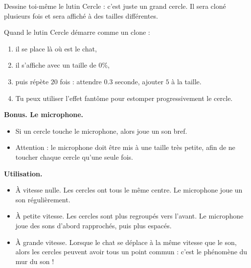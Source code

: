 \documentclass[class=report,crop=false, 12pt]{standalone}
\begin{document}
\begin{activite}
Dessine toi-même le lutin \og Cercle \fg{} : c'est juste un grand cercle. 
Il sera cloné plusieurs fois et sera affiché à des tailles différentes.

Quand le lutin \og{}Cercle\fg{} démarre comme un clone :
\begin{enumerate}
  \item il se place là où est le chat,
  \item il s'affiche avec un taille de $0\%$,
  \item puis répète $20$ fois : attendre $0.3$ seconde, ajouter $5$ à la taille.
  \item Tu peux utiliser l'effet \og fantôme \fg{} pour estomper progressivement le cercle.
\end{enumerate}


\bigskip
\textbf{Bonus. Le microphone.}

\begin{itemize}
  \item Si un cercle touche le microphone, alors joue un son bref.
  \item Attention : le microphone doit être mis à une taille très petite, afin de ne toucher chaque cercle qu'une seule fois.
\end{itemize}




\bigskip
\textbf{Utilisation.}

\begin{itemize}
  \item À vitesse nulle. Les cercles ont tous le même centre. Le microphone joue un son régulièrement.
  
  \item À petite vitesse. Les cercles sont plus regroupés vers l'avant. Le microphone joue des sons d'abord rapprochés, puis plus espacés. 
  
  \item À grande vitesse. Lorsque le chat se déplace à la même vitesse que le son, alors les cercles peuvent avoir tous un point commun : c'est le phénomène du mur du son ! 
\end{itemize}

\end{activite}
\end{document}
